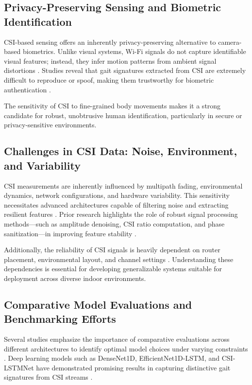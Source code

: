 \subsection{Privacy-Preserving Sensing and Biometric Identification}

CSI-based sensing offers an inherently privacy-preserving alternative to camera-based biometrics. Unlike visual systems, Wi-Fi signals do not capture identifiable visual features; instead, they infer motion patterns from ambient signal distortions \parencite{ma2019wifisensing}. Studies reveal that gait signatures extracted from CSI are extremely difficult to reproduce or spoof, making them trustworthy for biometric authentication \parencite{zeng2016wiwho,zhang2021gaitsense,chen2023wigait}. 

The sensitivity of CSI to fine-grained body movements makes it a strong candidate for robust, unobtrusive human identification, particularly in secure or privacy-sensitive environments.

\subsection{Challenges in CSI Data: Noise, Environment, and Variability}

CSI measurements are inherently influenced by multipath fading, environmental dynamics, network configurations, and hardware variability. This sensitivity necessitates advanced architectures capable of filtering noise and extracting resilient features \parencite{pereira2025sokcsi}. Prior research highlights the role of robust signal processing methods—such as amplitude denoising, CSI ratio computation, and phase sanitization—in improving feature stability \parencite{yang2021csienhance,zeng2021csiratio}.

Additionally, the reliability of CSI signals is heavily dependent on router placement, environmental layout, and channel settings \parencite{zhuravchak2022wifi_har,pereira2025sokcsi}. Understanding these dependencies is essential for developing generalizable systems suitable for deployment across diverse indoor environments.

\subsection{Comparative Model Evaluations and Benchmarking Efforts}

Several studies emphasize the importance of comparative evaluations across different architectures to identify optimal model choices under varying constraints \parencite{yang2023sensefi}. Deep learning models such as DenseNet1D, EfficientNet1D-LSTM, and CSI-LSTMNet have demonstrated promising results in capturing distinctive gait signatures from CSI streams \parencite{zhang2021gaitsense}. 

